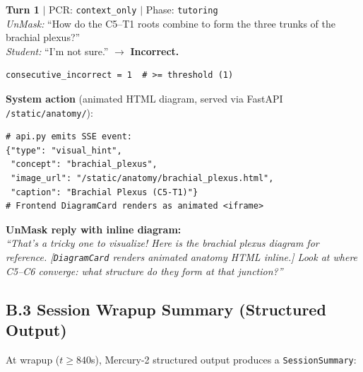 \documentclass[11pt]{article}
\begin{document}
\noindent\textbf{Turn 1} $|$ PCR: \texttt{context\_only} $|$ Phase: \texttt{tutoring}\\
\textit{UnMask:} ``How do the C5--T1 roots combine to form the three trunks
of the brachial plexus?''\\
\textit{Student:} ``I'm not sure.'' $\to$ \textbf{Incorrect.}
\begin{lstlisting}
consecutive_incorrect = 1  # >= threshold (1)
\end{lstlisting}

\noindent\textbf{System action} (animated HTML diagram, served via FastAPI \texttt{/static/anatomy/}):
\begin{lstlisting}
# api.py emits SSE event:
{"type": "visual_hint",
 "concept": "brachial_plexus",
 "image_url": "/static/anatomy/brachial_plexus.html",
 "caption": "Brachial Plexus (C5-T1)"}
# Frontend DiagramCard renders as animated <iframe>
\end{lstlisting}

\noindent\textbf{UnMask reply with inline diagram:}\\
\textit{``That's a tricky one to visualize! Here is the brachial plexus
diagram for reference. [\texttt{DiagramCard} renders animated anatomy HTML inline.] Look at where C5--C6
converge: what structure do they form at that junction?''}

\subsection*{B.3 Session Wrapup Summary (Structured Output)}

At wrapup ($t \geq 840$s), Mercury-2 structured output produces
a \texttt{SessionSummary}:
\end{document}
